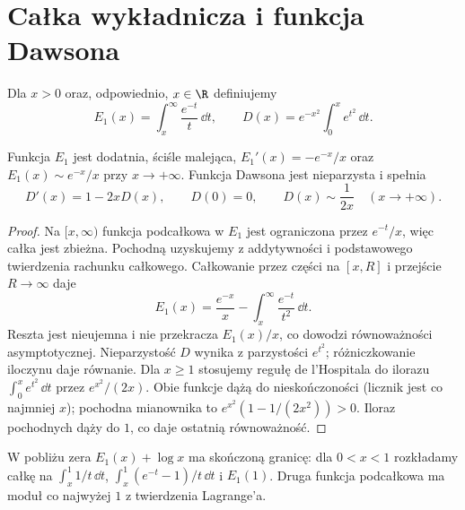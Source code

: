 \section{Całka wykładnicza i funkcja Dawsona}
\begin{definicja}
\label{ma1:def:e1-dawson}
Dla $x>0$ oraz, odpowiednio, $x\in\R$ definiujemy
\[
 E_1(x)=\int_x^\infty\frac{e^{-t}}{t}\,\dd t,\qquad
 D(x)=e^{-x^2}\int_0^x e^{t^2}\,\dd t.
\]
\end{definicja}
\begin{stwierdzenie}
\label{ma1:prop:e1-dawson}
Funkcja $E_1$ jest dodatnia, ściśle malejąca,
$E_1'(x)=-e^{-x}/x$ oraz $E_1(x)\sim e^{-x}/x$
przy $x\to+\infty$.
Funkcja Dawsona jest nieparzysta i spełnia
\[
 D'(x)=1-2xD(x),\qquad D(0)=0,\qquad
 D(x)\sim\frac1{2x}\quad(x\to+\infty).
\]
\end{stwierdzenie}
\begin{proof}
Na $[x,\infty)$ funkcja podcałkowa w $E_1$ jest
ograniczona przez $e^{-t}/x$, więc całka jest zbieżna.
Pochodną uzyskujemy z addytywności i podstawowego
twierdzenia rachunku całkowego. Całkowanie przez
części na $[x,R]$ i przejście $R\to\infty$ daje
\[
 E_1(x)=\frac{e^{-x}}x-\int_x^\infty\frac{e^{-t}}{t^2}\,\dd t.
\]
Reszta jest nieujemna i nie przekracza $E_1(x)/x$,
co dowodzi równoważności asymptotycznej.
Nieparzystość $D$ wynika z parzystości $e^{t^2}$;
różniczkowanie iloczynu daje równanie.
Dla $x\ge1$ stosujemy regułę de l'Hospitala do
ilorazu $\int_0^x e^{t^2}\,\dd t$ przez $e^{x^2}/(2x)$.
Obie funkcje dążą do nieskończoności (licznik jest
co najmniej $x$); pochodna mianownika to
$e^{x^2}(1-1/(2x^2))>0$. Iloraz pochodnych dąży do $1$,
co daje ostatnią równoważność.
\end{proof}
W pobliżu zera $E_1(x)+\log x$ ma skończoną granicę:
dla $0<x<1$ rozkładamy całkę na
$\int_x^1 1/t\,\dd t$, $\int_x^1(e^{-t}-1)/t\,\dd t$
i $E_1(1)$. Druga funkcja podcałkowa ma moduł co najwyżej $1$
z twierdzenia Lagrange'a.

